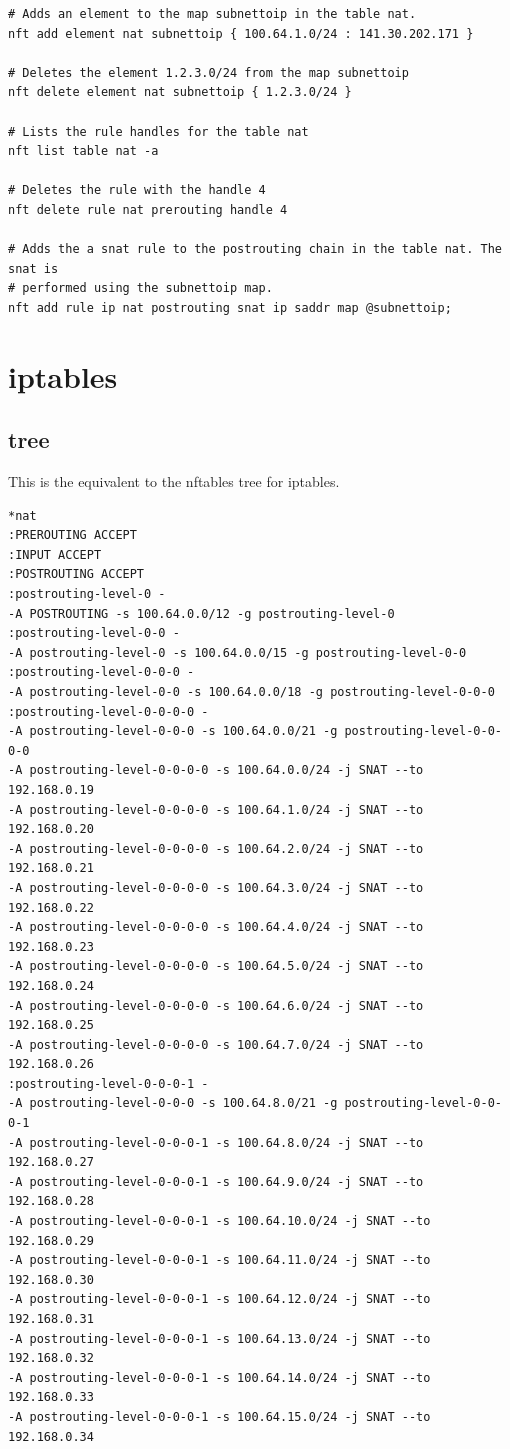 \documentclass{report}
\begin{document}
\begin{verbatim}
# Adds an element to the map subnettoip in the table nat.
nft add element nat subnettoip { 100.64.1.0/24 : 141.30.202.171 }

# Deletes the element 1.2.3.0/24 from the map subnettoip
nft delete element nat subnettoip { 1.2.3.0/24 }

# Lists the rule handles for the table nat
nft list table nat -a

# Deletes the rule with the handle 4
nft delete rule nat prerouting handle 4

# Adds the a snat rule to the postrouting chain in the table nat. The snat is
# performed using the subnettoip map.
nft add rule ip nat postrouting snat ip saddr map @subnettoip;

\end{verbatim}
\endgroup

\section{iptables}

\subsection{tree}\label{iptables-1}

This is the equivalent to the nftables tree for iptables.

\begingroup
\fontsize{9pt}{9pt}\selectfont
\begin{verbatim}
*nat
:PREROUTING ACCEPT
:INPUT ACCEPT
:POSTROUTING ACCEPT
:postrouting-level-0 -
-A POSTROUTING -s 100.64.0.0/12 -g postrouting-level-0
:postrouting-level-0-0 -
-A postrouting-level-0 -s 100.64.0.0/15 -g postrouting-level-0-0
:postrouting-level-0-0-0 -
-A postrouting-level-0-0 -s 100.64.0.0/18 -g postrouting-level-0-0-0
:postrouting-level-0-0-0-0 -
-A postrouting-level-0-0-0 -s 100.64.0.0/21 -g postrouting-level-0-0-0-0
-A postrouting-level-0-0-0-0 -s 100.64.0.0/24 -j SNAT --to 192.168.0.19
-A postrouting-level-0-0-0-0 -s 100.64.1.0/24 -j SNAT --to 192.168.0.20
-A postrouting-level-0-0-0-0 -s 100.64.2.0/24 -j SNAT --to 192.168.0.21
-A postrouting-level-0-0-0-0 -s 100.64.3.0/24 -j SNAT --to 192.168.0.22
-A postrouting-level-0-0-0-0 -s 100.64.4.0/24 -j SNAT --to 192.168.0.23
-A postrouting-level-0-0-0-0 -s 100.64.5.0/24 -j SNAT --to 192.168.0.24
-A postrouting-level-0-0-0-0 -s 100.64.6.0/24 -j SNAT --to 192.168.0.25
-A postrouting-level-0-0-0-0 -s 100.64.7.0/24 -j SNAT --to 192.168.0.26
:postrouting-level-0-0-0-1 -
-A postrouting-level-0-0-0 -s 100.64.8.0/21 -g postrouting-level-0-0-0-1
-A postrouting-level-0-0-0-1 -s 100.64.8.0/24 -j SNAT --to 192.168.0.27
-A postrouting-level-0-0-0-1 -s 100.64.9.0/24 -j SNAT --to 192.168.0.28
-A postrouting-level-0-0-0-1 -s 100.64.10.0/24 -j SNAT --to 192.168.0.29
-A postrouting-level-0-0-0-1 -s 100.64.11.0/24 -j SNAT --to 192.168.0.30
-A postrouting-level-0-0-0-1 -s 100.64.12.0/24 -j SNAT --to 192.168.0.31
-A postrouting-level-0-0-0-1 -s 100.64.13.0/24 -j SNAT --to 192.168.0.32
-A postrouting-level-0-0-0-1 -s 100.64.14.0/24 -j SNAT --to 192.168.0.33
-A postrouting-level-0-0-0-1 -s 100.64.15.0/24 -j SNAT --to 192.168.0.34
\end{verbatim}
\endgroup
\end{document}
